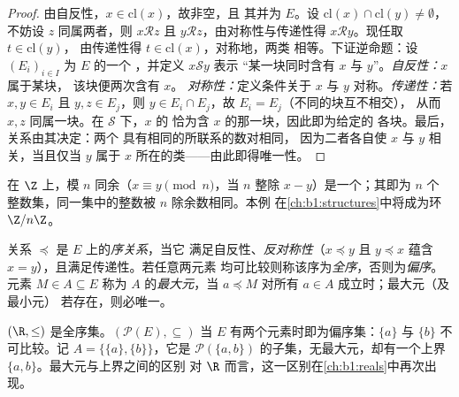 \begin{proof}
由自反性，$x \in \mathrm{cl}(x)$，故非空，且
其并为 $E$。设 $\mathrm{cl}(x) \cap \mathrm{cl}(y) \neq \emptyset$，
不妨设 $z$ 同属两者，则 $x \mathbin{\mathcal{R}} z$ 且 $y
\mathbin{\mathcal{R}} z$，由对称性与传递性得 $x
\mathbin{\mathcal{R}} y$。现任取 $t \in \mathrm{cl}(y)$，
由传递性得 $t \in \mathrm{cl}(x)$，对称地，两类
相等。下证逆命题：设 $(E_i)_{i \in I}$ 为 $E$ 的一个
，并定义 $x \mathbin{\mathcal S} y$ 表示
“某一块同时含有 $x$ 与 $y$”。\emph{自反性：}$x$ 属于某块，
该块便两次含有 $x$。
\emph{对称性：}定义条件关于 $x$ 与
$y$ 对称。\emph{传递性：}若 $x, y \in E_i$ 且 $y, z \in E_j$，则
$y \in E_i \cap E_j$，故 $E_i = E_j$（不同的块互不相交），
从而 $x, z$ 同属一块。在 $\mathcal S$ 下，$x$ 的
恰为含 $x$ 的那一块，因此即为给定的
各块。最后，关系由其决定：两个
具有相同的所联系的数对相同，
因为二者各自使 $x$ 与 $y$ 相关，当且仅当 $y$ 属于
$x$ 所在的类——由此即得唯一性。
\end{proof}

\begin{example}\label{ex:b1:logic:congruence}
在 $\Z$ 上，模 $n$ 同余（$x \equiv y \pmod n$，当 $n$ 整除
$x - y$）是一个；其即为 $n$ 个
整数集，同一集中的整数被 $n$ 除余数相同。本例
在\cref{ch:b1:structures}中将成为环 $\Z/n\Z$。
\end{example}

\begin{definition}[序关系]\label{def:b1:logic:order}
关系 $\preceq$ 是 $E$ 上的\emph{序关系}，当它
满足自反性、\emph{反对称性}（$x \preceq y$ 且 $y
\preceq x$ 蕴含 $x = y$），且满足传递性。若任意两元素
均可比较则称该序为\emph{全序}，否则为\emph{偏序}。元素
$M \in A \subseteq E$ 称为 $A$ 的\emph{最大元}，当
$a \preceq M$ 对所有 $a \in A$ 成立时；最大元（及最小元）
若存在，则必唯一。
\end{definition}

\begin{example}\label{ex:b1:logic:orders}
$(\R, \leq)$ 是全序集。$(\mathcal{P}(E), \subseteq)$ 当
$E$ 有两个元素时即为偏序集：$\{a\}$ 与
$\{b\}$ 不可比较。记 $A = \{\{a\}, \{b\}\}$，它是
$\mathcal{P}(\{a,b\})$ 的子集，无最大元，却有一个上界
$\{a, b\}$。最大元与上界之间的区别
对 $\R$ 而言，这一区别在\cref{ch:b1:reals}中再次出现。
\end{example}

